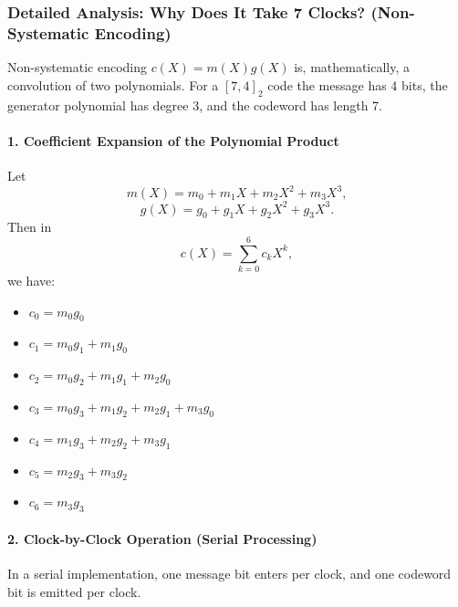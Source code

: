 \documentclass[11pt,oneside]{book}
\providecommand{\tightlist}{\setlength{\itemsep}{0pt}\setlength{\parskip}{0pt}}
\theoremstyle{plain}
\theoremstyle{definition}
\theoremstyle{remark}
\begin{document}
\subsubsection{Detailed Analysis: Why Does It Take 7 Clocks?
(Non-Systematic
Encoding)}\label{detailed-analysis-why-does-it-take-7-clocks-non-systematic-encoding}

Non-systematic encoding \(c(X)=m(X)g(X)\) is, mathematically, a
convolution of two polynomials. For a \([7,4]_2\) code the message has 4
bits, the generator polynomial has degree 3, and the codeword has length
7.

\paragraph{1. Coefficient Expansion of the Polynomial
Product}\label{coefficient-expansion-of-the-polynomial-product}

Let \[m(X)=m_0+m_1X+m_2X^2+m_3X^3,\] \[g(X)=g_0+g_1X+g_2X^2+g_3X^3.\]
Then in \[c(X)=\sum_{k=0}^{6} c_k X^k,\] we have:

\begin{itemize}
\tightlist
\item
  \(c_0 = m_0 g_0\)
\item
  \(c_1 = m_0 g_1 + m_1 g_0\)
\item
  \(c_2 = m_0 g_2 + m_1 g_1 + m_2 g_0\)
\item
  \(c_3 = m_0 g_3 + m_1 g_2 + m_2 g_1 + m_3 g_0\)
\item
  \(c_4 = m_1 g_3 + m_2 g_2 + m_3 g_1\)
\item
  \(c_5 = m_2 g_3 + m_3 g_2\)
\item
  \(c_6 = m_3 g_3\)
\end{itemize}

\paragraph{2. Clock-by-Clock Operation (Serial
Processing)}\label{clock-by-clock-operation-serial-processing}

In a serial implementation, one message bit enters per clock, and one
codeword bit is emitted per clock.
\end{document}
